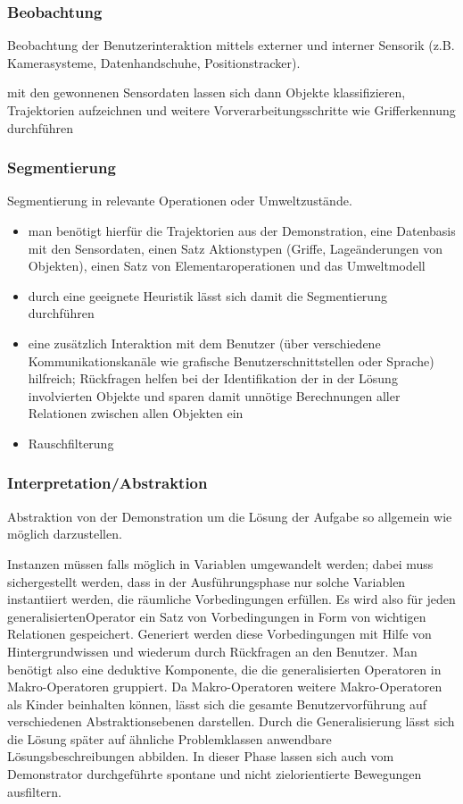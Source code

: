 \subsubsection*{Beobachtung}
Beobachtung der Benutzerinteraktion mittels externer und interner Sensorik (z.B. Kamerasysteme, Datenhandschuhe, Positionstracker).
\begin{itemize}
\ita mit den gewonnenen Sensordaten lassen sich dann Objekte klassifizieren, Trajektorien aufzeichnen und weitere Vorverarbeitungsschritte wie
Grifferkennung durchführen
\end{itemize}

\subsubsection*{Segmentierung}
Segmentierung in relevante Operationen oder Umweltzustände. 
\begin{itemize}
\item man benötigt hierfür die Trajektorien aus der Demonstration, eine Datenbasis mit den Sensordaten, einen Satz Aktionstypen (Griffe, Lageänderungen von Objekten), einen Satz
von Elementaroperationen und das Umweltmodell
\item durch eine geeignete Heuristik lässt sich damit die Segmentierung durchführen
\item eine zusätzlich Interaktion mit dem Benutzer (über verschiedene Kommunikationskanäle wie grafische Benutzerschnittstellen oder Sprache) hilfreich; 
Rückfragen helfen bei der Identifikation der in der Lösung involvierten Objekte und sparen damit unnötige Berechnungen aller Relationen zwischen allen Objekten
ein
\item Rauschfilterung
\end{itemize}
\subsubsection*{Interpretation/Abstraktion}
Abstraktion von der Demonstration um die Lösung der Aufgabe so allgemein wie möglich darzustellen.
\begin{itemize}
\ita Instanzen müssen falls möglich in Variablen umgewandelt werden; dabei muss sichergestellt werden, dass in der Ausführungsphase nur solche Variablen instantiiert
werden, die räumliche Vorbedingungen erfüllen. Es wird also für jeden \Gu generalisierten\Go Operator ein Satz von Vorbedingungen in Form von wichtigen Relationen
gespeichert. Generiert werden diese Vorbedingungen mit Hilfe von Hintergrundwissen und wiederum durch Rückfragen an den Benutzer. Man benötigt also eine deduktive
Komponente, die die generalisierten Operatoren in Makro-Operatoren gruppiert. Da Makro-Operatoren weitere Makro-Operatoren als Kinder beinhalten können, lässt
sich die gesamte Benutzervorführung auf verschiedenen Abstraktionsebenen darstellen. Durch die Generalisierung lässt sich die Lösung später auf ähnliche Problemklassen anwendbare Lösungsbeschreibungen abbilden. In dieser Phase lassen sich auch vom Demonstrator durchgeführte spontane und nicht zielorientierte Bewegungen ausfiltern.
\end{itemize}
